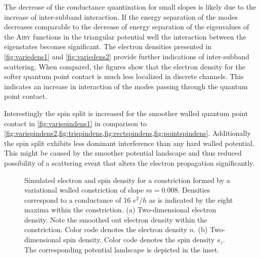 The decrease of the conductance quantization for small slopes is likely due to the increase of inter-subband interaction. If the energy separation of the modes decreases comparable to the decrease of energy separation of the eigenvalues of the \textsc{Airy} functions in the triangular potential well the interaction between the eigenstates becomes significant. The electron densities presented in \cref{fig:variedens1} and \cref{fig:variedens2} provide further indications of inter-subband scattering. When compared, the figures show that the electron density for the softer quantum point contact is much less localized in discrete channels. This indicates an increase in interaction of the modes passing through the quantum point contact.\par
Interestingly the spin split is increased for the smoother walled quantum point contact in \cref{fig:varispindens1} in comparison to \cref{fig:varispindens2,fig:trispindens,fig:rectspindens,fig:pointspindens}. Additionally the spin split exhibits less dominant interference than any hard walled potential. This might be caused by the smoother potential landscape and thus reduced possibility of a scattering event that alters the electron propagation significantly.\par
\begin{figure}[h]
  \hspace{14pt}
  \hspace{4pt}
  \caption{Simulated electron and spin density for a constriction formed by a variational walled constriction of slope $m=0.008$. Densities correspond to a conductance of 16 $e^2/h$ as is indicated by the eight maxima within the constriction. (a) Two-dimensional electron density. Note the smoothed out electron density within the constriction. Color code denotes the electron density $n$. (b) Two-dimensional spin density. Color code denotes the spin density $s_z$. The corresponding potential landscape is depicted in the inset.}
\end{figure}
